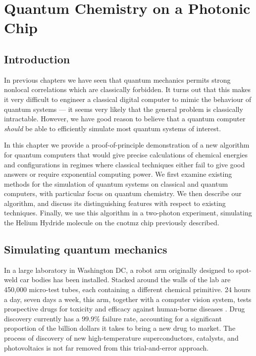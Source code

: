 \chapter{Quantum Chemistry on a Photonic Chip}
\label{chap:quantum-chemistry}

\section{Introduction}
In previous chapters we have seen that quantum mechanics permits strong nonlocal correlations which are classically forbidden. It turns out that this makes it very difficult to engineer a classical digital computer to mimic the behaviour of quantum systems --- it seems very likely that the general problem is classically intractable. However, we have good reason to believe that a quantum computer \emph{should} be able to efficiently simulate most quantum systems of interest. 

In this chapter we  provide a proof-of-principle demonstration of a new algorithm for quantum computers that would give precise calculations of chemical energies and configurations in regimes where classical techniques either fail to give good answers or require exponential computing power.
We first examine existing methods for the simulation of quantum systems on classical and quantum computers, with particular focus on quantum chemistry. We then describe our algorithm, and discuss its distinguishing features with respect to existing techniques. Finally, we use this algorithm in a two-photon experiment, simulating the Helium Hydride molecule on the \acrshort{cnotmz} chip previously described.

\section{Simulating quantum mechanics}
In a large laboratory in Washington DC, a robot arm originally designed to spot-weld car bodies has been installed. Stacked around the walls of the lab are 450,000 micro-test tubes, each containing a different chemical primitive. 24 hours a day, seven days a week, this arm, together with a computer vision system, tests prospective drugs for toxicity and efficacy against human-borne diseases \cite{S2008}. Drug discovery currently has a 99.9\% failure rate, accounting for a significant proportion of the billion dollars it takes to bring a new drug to market. The process of discovery of new high-temperature superconductors, catalysts, and  photovoltaics is not far removed from this trial-and-error approach. 

